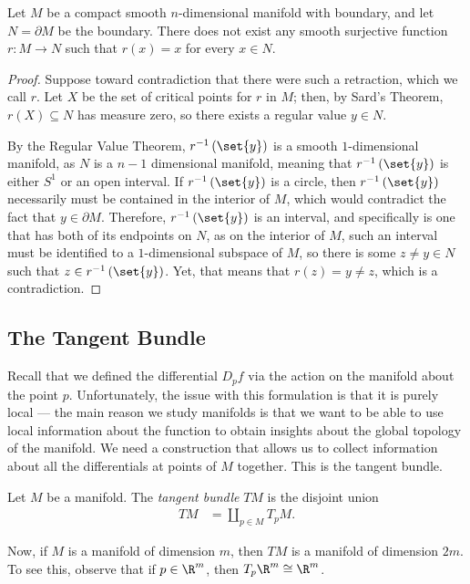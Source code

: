 \documentclass[10pt]{mypackage}
\begin{document}
\begin{theorem}
  Let $M$ be a compact smooth $n$-dimensional manifold with boundary, and let $N = \partial M$ be the boundary. There does not exist any smooth surjective function $r\colon M\rightarrow N$ such that $r(x) = x$ for every $x\in N$.
\end{theorem}
\begin{proof}
  Suppose toward contradiction that there were such a retraction, which we call $r$. Let $X$ be the set of critical points for $r$ in $M$; then, by Sard's Theorem, $r(X)\subseteq N$ has measure zero, so there exists a regular value $y\in N$.\newline

  By the Regular Value Theorem, $r^{-1}\left( \set{y} \right)$ is a smooth $1$-dimensional manifold, as $N$ is a $n-1$ dimensional manifold, meaning that $r^{-1}\left( \set{y} \right)$ is either $S^{1}$ or an open interval. If $r^{-1}\left( \set{y} \right)$ is a circle, then $r^{-1}\left( \set{y} \right)$ necessarily must be contained in the interior of $M$, which would contradict the fact that $y\in \partial M$. Therefore, $r^{-1}\left( \set{y} \right)$ is an interval, and specifically is one that has both of its endpoints on $N$, as on the interior of $M$, such an interval must be identified to a $1$-dimensional subspace of $M$, so there is some $z\neq y\in N$ such that $z\in r^{-1}\left( \set{y} \right)$. Yet, that means that $r(z) = y \neq z$, which is a contradiction.
\end{proof}
\subsection{The Tangent Bundle}%
Recall that we defined the differential $D_pf$ via the action on the manifold about the point $p$. Unfortunately, the issue with this formulation is that it is purely local --- the main reason we study manifolds is that we want to be able to use local information about the function to obtain insights about the global topology of the manifold. We need a construction that allows us to collect information about all the differentials at points of $M$ together. This is the tangent bundle.
\begin{definition}
  Let $M$ be a manifold. The \textit{tangent bundle} $TM$ is the disjoint union
  \begin{align*}
    TM &= \coprod _{p\in M} T_pM.
  \end{align*}
\end{definition}
Now, if $M$ is a manifold of dimension $m$, then $TM$ is a manifold of dimension $2m$. To see this, observe that if $p\in \R^{m}$, then $T_p\R^{m}\cong \R^{m}$.\newline
\end{document}
